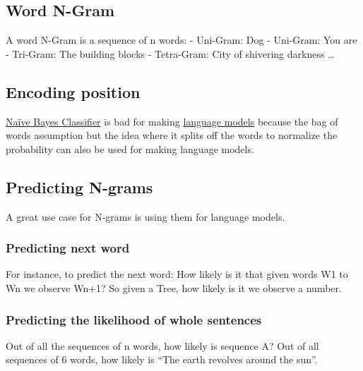 \documentclass[
  11pt,
  british,
]{article}
\begin{document}
\hypertarget{word-n-gram}{%
\subsection{Word N-Gram}\label{word-n-gram}}

A word N-Gram is a sequence of n words: - Uni-Gram: Dog - Uni-Gram: You
are - Tri-Gram: The building blocks - Tetra-Gram: City of shivering
darkness \ldots{}

\hypertarget{encoding-position}{%
\subsection{Encoding position}\label{encoding-position}}

\href{../Classification/Native\%20baiyes/Naïve\%20Bayes\%20Classifier.md}{Naïve
Bayes Classifier} is bad for making
\href{../Prediction/Language\%20Modeling.md}{language models} because
the bag of words assumption but the idea where it splits off the words
to normalize the probability can also be used for making language
models.

\hypertarget{predicting-n-grams}{%
\subsection{Predicting N-grams}\label{predicting-n-grams}}

A great use case for N-grams is using them for language models.

\hypertarget{predicting-next-word}{%
\subsubsection{Predicting next word}\label{predicting-next-word}}

For instance, to predict the next word: How likely is it that given
words W1 to Wn we observe Wn+1? So given a Tree, how likely is it we
observe a number.

\hypertarget{predicting-the-likelihood-of-whole-sentences}{%
\subsubsection{Predicting the likelihood of whole
sentences}\label{predicting-the-likelihood-of-whole-sentences}}

Out of all the sequences of n words, how likely is sequence A? Out of
all sequences of 6 words, how likely is ``The earth revolves around the
sun''.
\end{document}
